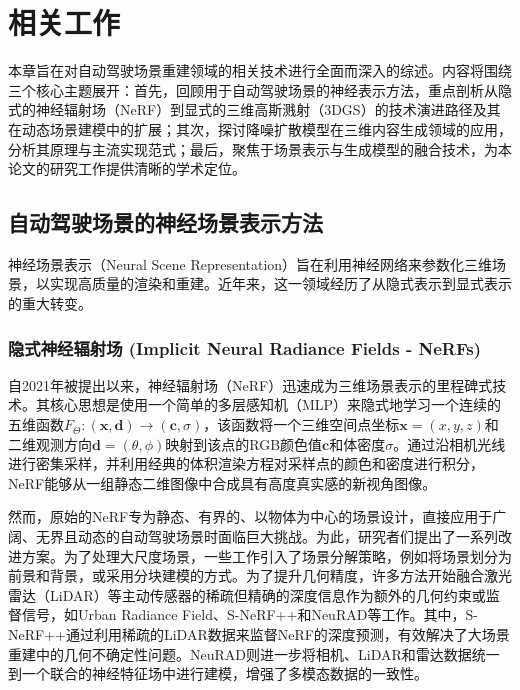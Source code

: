 
\chapter{相关工作}

本章旨在对自动驾驶场景重建领域的相关技术进行全面而深入的综述。内容将围绕三个核心主题展开：首先，回顾用于自动驾驶场景的神经表示方法，重点剖析从隐式的神经辐射场（NeRF）到显式的三维高斯溅射（3DGS）的技术演进路径及其在动态场景建模中的扩展；其次，探讨降噪扩散模型在三维内容生成领域的应用，分析其原理与主流实现范式；最后，聚焦于场景表示与生成模型的融合技术，为本论文的研究工作提供清晰的学术定位。

\section{自动驾驶场景的神经场景表示方法}

神经场景表示（Neural Scene Representation）旨在利用神经网络来参数化三维场景，以实现高质量的渲染和重建。近年来，这一领域经历了从隐式表示到显式表示的重大转变。

\subsection{隐式神经辐射场 (Implicit Neural Radiance Fields - NeRFs)}

自2021年被提出以来，神经辐射场（NeRF）迅速成为三维场景表示的里程碑式技术\cite{mildenhall2021nerf}。其核心思想是使用一个简单的多层感知机（MLP）来隐式地学习一个连续的五维函数$F_{\Theta}: (\mathbf{x}, \mathbf{d}) \rightarrow (\mathbf{c}, \sigma)$，该函数将一个三维空间点坐标$\mathbf{x} = (x, y, z)$和二维观测方向$\mathbf{d} = (\theta, \phi)$映射到该点的RGB颜色值$\mathbf{c}$和体密度$\sigma$\cite{mildenhall2021nerf}。通过沿相机光线进行密集采样，并利用经典的体积渲染方程对采样点的颜色和密度进行积分，NeRF能够从一组静态二维图像中合成具有高度真实感的新视角图像。

然而，原始的NeRF专为静态、有界的、以物体为中心的场景设计，直接应用于广阔、无界且动态的自动驾驶场景时面临巨大挑战。为此，研究者们提出了一系列改进方案。为了处理大尺度场景，一些工作引入了场景分解策略，例如将场景划分为前景和背景，或采用分块建模的方式\cite{chen2025snerf}。为了提升几何精度，许多方法开始融合激光雷达（LiDAR）等主动传感器的稀疏但精确的深度信息作为额外的几何约束或监督信号，如Urban Radiance Field、S-NeRF++和NeuRAD等工作\cite{chen2025snerf}。其中，S-NeRF++通过利用稀疏的LiDAR数据来监督NeRF的深度预测，有效解决了大场景重建中的几何不确定性问题\cite{chen2025snerf}。NeuRAD则进一步将相机、LiDAR和雷达数据统一到一个联合的神经特征场中进行建模，增强了多模态数据的一致性\cite{tonderski2024neurad}。

